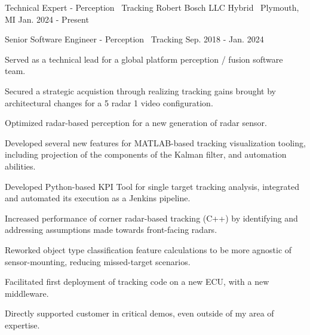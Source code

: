 

\begin{cventries}

  \cventry
    {Technical Expert - Perception \textbar\ Tracking} %
    {Robert Bosch LLC} %
    {Hybrid \textbar\ Plymouth, MI} %
    {Jan. 2024 - Present} %
    {
    }

  \cventrytitle
    {Senior Software Engineer - Perception \textbar\ Tracking} %
    {} %
    {} %
    {Sep. 2018 - Jan. 2024} %
    {
      \begin{cvitems} %
        \item {Served as a technical lead for a global platform perception / fusion software team.}
        \item {Secured a strategic acquistion through realizing tracking gains brought by architectural changes for a 5 radar 1 video configuration.}
        \item {Optimized radar-based perception for a new generation of radar sensor.}
        \item {Developed several new features for MATLAB-based tracking visualization tooling, including projection of the components of the Kalman filter, and automation abilities.}
        \item {Developed Python-based KPI Tool for single target tracking analysis, integrated and automated its execution as a Jenkins pipeline.}
        \item {Increased performance of corner radar-based tracking (C++) by identifying and addressing assumptions made towards front-facing radars.}
        \item {Reworked object type classification feature calculations to be more agnostic of sensor-mounting, reducing missed-target scenarios.}
        \iflongform        
          \item {Facilitated first deployment of tracking code on a new ECU, with a new middleware.}
          \item {Directly supported customer in critical demos, even outside of my area of expertise.}

\end{cvitems}}
\end{cventries}
